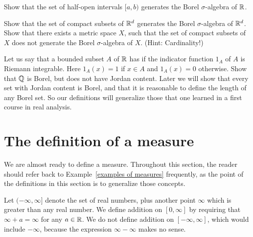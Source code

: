 \begin{exercise}
Show that the set of half-open intervals $[a, b)$ generates the Borel $\sigma$-algebra of $\mathbb{R}$.
\end{exercise}

\begin{exercise}
Show that the set of compact subsets of $\mathbb{R}^d$ generates the Borel $\sigma$-algebra of $\mathbb{R}^d$.
Show that there exists a metric space $X$, such that the set of compact subsets of $X$ does not generate the Borel $\sigma$-algebra of $X$. (Hint: Cardinality!)
\end{exercise}

\begin{exercise}\label{Jordan content 1}
Let us say that a bounded subset $A$ of $\mathbb{R}$ has  if the indicator function $1_A$ of $A$ is Riemann integrable.
Here $1_A(x) = 1$ if $x \in A$ and $1_A(x) = 0$ otherwise.
Show that $\mathbb{Q}$ is Borel, but does not have Jordan content.
Later we will show that every set with Jordan content is Borel, and that it is reasonable to define the length of any Borel set.
So our definitions will generalize those that one learned in a first course in real analysis.
\end{exercise}


\section{The definition of a measure}
We are almost ready to define a measure.
Throughout this section, the reader should refer back to Example~\ref{examples of measures} frequently, as the point of the definitions in this section is to generalize those concepts.

\begin{subsec}
Let $(-\infty, \infty]$ denote the set of real numbers, plus another point $\infty$ which is greater than any real number.
We define addition on $[0, \infty]$ by requiring that $\infty + a = \infty$ for any $a \in \mathbb{R}$.
We do not define addition on $[-\infty, \infty]$, which would include $-\infty$, because the expression $\infty - \infty$ makes no sense.
\end{subsec}


